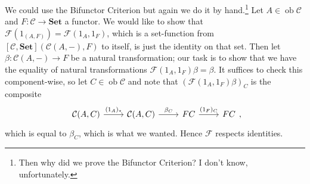 \documentclass{report}
\newcommand{\mbold}[1]{\mathrm{\mathbf{#1}}}
\DeclareMathOperator{\ob}{ob}
\theoremstyle{definition}
\theoremstyle{plain}
\theoremstyle{definition}
\begin{document}
		We could use the Bifunctor Criterion but again we do it by hand.\footnote{Then why did we prove the Bifunctor Criterion? I don't know, unfortunately.} Let $A\in\ob\mathcal{C}$ and $F \colon \mathcal{C}\to \mbold{Set}$ a functor. We would like to show that $\mathscr{F}(1_{(A,F)}) =\mathscr{F}(1_A,1_F)$, which is a set-function from $[\mathcal{C},\mbold{Set}](\mathcal{C}(A,-),F)$ to itself, is just the identity on that set. Then let $\beta\colon \mathcal{C}(A,-)\to F$ be a natural transformation; our task is to show that we have the equality of natural transformations $\mathscr{F}(1_A,1_F)\beta = \beta$. It suffices to check this component-wise, so let $C\in\ob\mathcal{C}$ and note that $(\mathscr{F}(1_A,1_F)\beta)_C$ is the composite
		\[\begin{tikzcd}
			{\mathcal{C}(A,C)} & {\mathcal{C}(A,C)} & FC & FC
			\arrow["{(1_A)_*}", from=1-1, to=1-2]
			\arrow["{\beta_C}", from=1-2, to=1-3]
			\arrow["{(1_F)_C}", from=1-3, to=1-4]
		\end{tikzcd},\]
		which is equal to $\beta_C$, which is what we wanted. Hence $\mathscr{F}$ respects identities.
		
\end{document}
